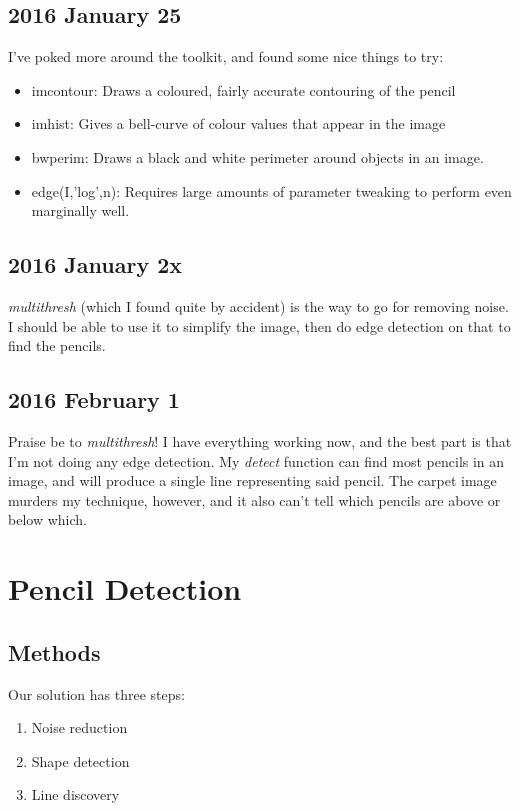 \documentclass{article}
\begin{document}
\subsection{2016 January 25}
I've poked more around the toolkit, and found some nice things to try:
\begin{itemize}
  \item imcontour: Draws a coloured, fairly accurate contouring of the pencil
  \item imhist: Gives a bell-curve of colour values that appear in the image
  \item bwperim: Draws a black and white perimeter around objects in an image.
  \item edge(I,'log',n): Requires large amounts of parameter tweaking to
    perform even marginally well.

\end{itemize}

\subsection{2016 January 2x}
\emph{multithresh} (which I found quite by accident) is the way to go for
removing noise. I should be able to use it to simplify the image, then do
edge detection on that to find the pencils.

\subsection{2016 February 1}
Praise be to \emph{multithresh}! I have everything working now, and
the best part is that I'm not doing any edge detection. My \emph{detect}
function can find most pencils in an image, and will produce a single line
representing said pencil. The carpet image murders my technique, however,
and it also can't tell which pencils are above or below which.

\section{Pencil Detection}

\subsection{Methods}
Our solution has three steps:
\begin{enumerate}
\item Noise reduction
\item Shape detection
\item Line discovery
\end{enumerate}
\end{document}
